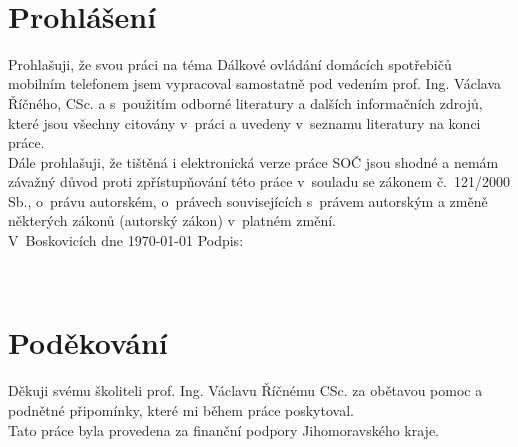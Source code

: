 \documentclass[12pt,a4paper,oneside]{article}
\begin{document}
\normalsize

\newpage

~ \vspace{128mm}

\section*{Prohlášení}

Prohlašuji, že svou práci na téma Dálkové ovládání domácích spotřebičů mobilním telefonem jsem vypracoval samostatně pod vedením prof. Ing. Václava Říčného, CSc. a s~použitím odborné literatury a dalších informačních zdrojů, které jsou všechny citovány v~práci a uvedeny v~seznamu literatury na konci práce. \\
Dále prohlašuji, že tištěná i elektronická verze práce SOČ jsou shodné a nemám závažný důvod proti zpřístupňování této práce v~souladu se zákonem č.~121/2000 Sb., o~právu autorském, o~právech souvisejících s~právem autorským a změně některých zákonů (autorský zákon) v~platném změní. \\[8mm]
V~Boskovicích dne \today \hspace{24mm} Podpis:

\newpage

~ \vspace{110mm}

\section*{Poděkování}

Děkuji svému školiteli prof. Ing. Václavu Říčnému CSc. za obětavou pomoc a podnětné připomínky, které mi během práce poskytoval. \\
Tato práce byla provedena za finanční podpory Jihomoravského kraje.
\end{document}
